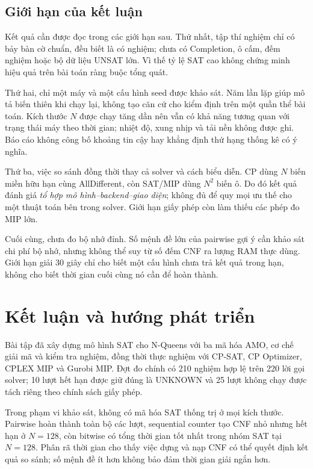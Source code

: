 \documentclass[a4paper,fleqn]{cas-sc}
\begin{document}
\subsection{Giới hạn của kết luận}\label{sec:limitations}
Kết quả cần được đọc trong các giới hạn sau. Thứ nhất, tập thí nghiệm chỉ có bảy bàn cờ chuẩn, đều biết là có nghiệm; chưa có Completion, ô cấm, đếm nghiệm hoặc bộ dữ liệu UNSAT lớn. Vì thế tỷ lệ SAT cao không chứng minh hiệu quả trên bài toán ràng buộc tổng quát.

Thứ hai, chỉ một máy và một cấu hình seed được khảo sát. Năm lần lặp giúp mô tả biến thiên khi chạy lại, không tạo căn cứ cho kiểm định trên một quần thể bài toán. Kích thước $N$ được chạy tăng dần nên vẫn có khả năng tương quan với trạng thái máy theo thời gian; nhiệt độ, xung nhịp và tải nền không được ghi. Báo cáo không công bố khoảng tin cậy hay khẳng định thứ hạng thống kê có ý nghĩa.

Thứ ba, việc so sánh đồng thời thay cả solver và cách biểu diễn. CP dùng $N$ biến miền hữu hạn cùng AllDifferent, còn SAT/MIP dùng $N^2$ biến ô. Do đó kết quả đánh giá \emph{tổ hợp mô hình--backend--giao diện}; không đủ để quy mọi ưu thế cho một thuật toán bên trong solver. Giới hạn giấy phép còn làm thiếu các phép đo MIP lớn.

Cuối cùng, chưa đo bộ nhớ đỉnh. Số mệnh đề lớn của pairwise gợi ý cần khảo sát chi phí bộ nhớ, nhưng không thể suy từ số đếm CNF ra lượng RAM thực dùng. Giới hạn giải 30 giây chỉ cho biết một cấu hình chưa trả kết quả trong hạn, không cho biết thời gian cuối cùng nó cần để hoàn thành.
\FloatBarrier

\section{Kết luận và hướng phát triển}\label{sec:conclusion}
Bài tập đã xây dựng mô hình SAT cho N-Queens với ba mã hóa AMO, cơ chế giải mã và kiểm tra nghiệm, đồng thời thực nghiệm với CP-SAT, CP Optimizer, CPLEX MIP và Gurobi MIP. Đợt đo chính có 210 nghiệm hợp lệ trên 220 lời gọi solver; 10 lượt hết hạn được giữ đúng là UNKNOWN và 25 lượt không chạy được tách riêng theo chính sách giấy phép.

Trong phạm vi khảo sát, không có mã hóa SAT thống trị ở mọi kích thước. Pairwise hoàn thành toàn bộ các lượt, sequential counter tạo CNF nhỏ nhưng hết hạn ở $N=128$, còn bitwise có tổng thời gian tốt nhất trong nhóm SAT tại $N=128$. Phân rã thời gian cho thấy việc dựng và nạp CNF có thể quyết định kết quả so sánh; số mệnh đề ít hơn không bảo đảm thời gian giải ngắn hơn.
\end{document}
